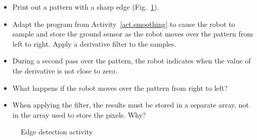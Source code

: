 
\begin{framed}
\begin{itemize}
\item Print out a pattern with a sharp edge (Fig.~\ref{fig.edge-activity}).
\item Adapt the program from Activity~\ref{act.smoothing} to cause the robot to sample and store the ground sensor as the robot moves over the pattern from left to right. Apply a derivative filter to the samples.
\item During a second pass over the pattern, the robot indicates when the value of the derivative is not close to zero.
\item What happens if the robot moves over the pattern from right to left?
\item When applying the filter, the results must be stored in a separate array, not in the array used to store the pixels. Why?
\end{itemize}
\end{framed}

\begin{figure}
\caption{Edge detection activity}\label{fig.edge-activity}
\end{figure}

